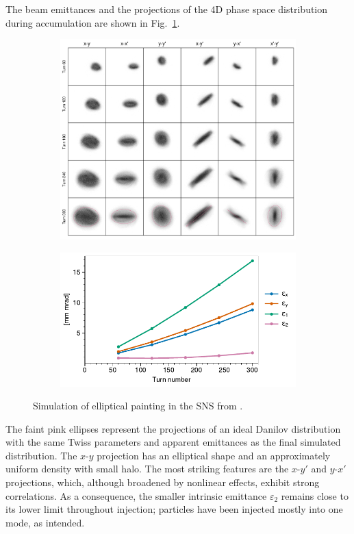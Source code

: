 The beam emittances and the projections of the 4D phase space distribution during accumulation are shown in Fig.~\ref{fig:Holmes}.
%
\begin{figure}[!p]
    \centering
    \begin{subfigure}{\textwidth}
        \includegraphics[width=\textwidth]{Images/chapter3/Holmes_snapshots.png}
    \end{subfigure}
    \vfill
    \vspace*{1.0cm}
    \vfill
    \begin{subfigure}{0.8\textwidth}
        \includegraphics[width=\textwidth]{Images/chapter3/Holmes_emittances.pdf}
    \end{subfigure}
    \caption{Simulation of elliptical painting in the SNS from \cite{Holmes2018}.}
    \label{fig:Holmes}
\end{figure}
%
The faint pink ellipses represent the projections of an ideal Danilov distribution with the same Twiss parameters and apparent emittances as the final simulated distribution. The $x$-$y$ projection has an elliptical shape and an approximately uniform density with small halo. The most striking features are the $x$-$y'$ and $y$-$x'$ projections, which, although broadened by nonlinear effects, exhibit strong correlations. As a consequence, the smaller intrinsic emittance $\varepsilon_2$ remains close to its lower limit throughout injection; particles have been injected mostly into one mode, as intended.

